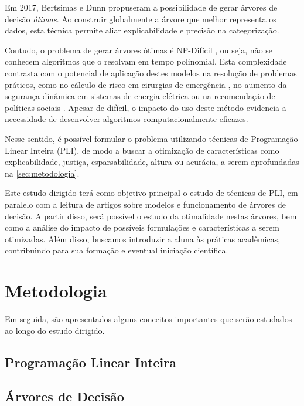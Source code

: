 \documentclass[12pt,a4paper]{article}
\begin{document}
Em 2017, Bertsimas e Dunn \cite{Bertsimas2017} propuseram a possibilidade de gerar árvores de decisão \emph{ótimas}. Ao construir globalmente a árvore que melhor representa os dados, esta técnica permite aliar explicabilidade e precisão na categorização. 

Contudo, o problema de gerar árvores ótimas é NP-Difícil \cite{HYAFIL197615}, ou seja, não se conhecem algoritmos que o resolvam em tempo polinomial. Esta complexidade contrasta com o potencial de aplicação destes modelos na resolução de problemas práticos, como no cálculo de risco em cirurgias de emergência \cite{Bertsimas2018}, no aumento da segurança dinâmica em sistemas de energia elétrica \cite{Genc2010} ou na recomendação de políticas sociais \cite{Chan2019}. Apesar de difícil, o impacto do uso deste método evidencia a necessidade de desenvolver algoritmos computacionalmente eficazes. 

Nesse sentido, é possível formular o problema utilizando técnicas de Programação
Linear Inteira (PLI), de modo a buscar a otimização de características como explicabilidade, justiça, esparsabilidade, altura ou acurácia, a serem aprofundadas na \autoref{sec:metodologia}.

Este estudo dirigido terá como objetivo principal o estudo de técnicas de PLI, em paralelo com a leitura de artigos sobre modelos e funcionamento de árvores de decisão. A partir disso, será possível o estudo da otimalidade nestas árvores, bem como a análise do impacto de possíveis formulações e características a serem otimizadas. Além disso, buscamos introduzir a aluna às práticas acadêmicas, contribuindo para sua formação e eventual iniciação científica.

\section{Metodologia} \label{sec:metodologia}

Em seguida, são apresentados alguns conceitos importantes que serão estudados ao longo do estudo dirigido.


\subsection{Programação Linear Inteira}

			

\subsection{Árvores de Decisão} 
\end{document}
